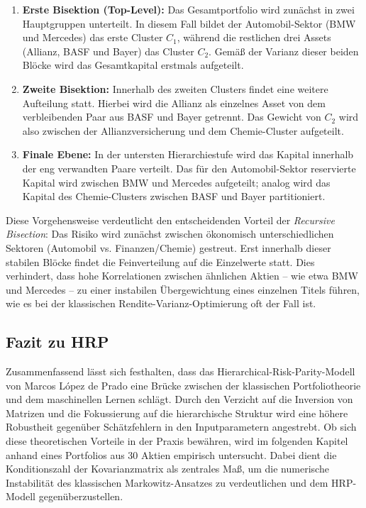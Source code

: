 \documentclass[parskip=half]{scrartcl}
\begin{document}
	\begin{enumerate}
		\item \textbf{Erste Bisektion (Top-Level):} Das Gesamtportfolio wird zunächst in zwei Hauptgruppen unterteilt. In diesem Fall bildet der Automobil-Sektor (BMW und Mercedes) das erste Cluster $C_1$, während die restlichen drei Assets (Allianz, BASF und Bayer) das Cluster $C_2$. Gemäß der Varianz dieser beiden Blöcke wird das Gesamtkapital erstmals aufgeteilt.
		\item \textbf{Zweite Bisektion:} Innerhalb des zweiten Clusters findet eine weitere Aufteilung statt. Hierbei wird die Allianz als einzelnes Asset von dem verbleibenden Paar aus BASF und Bayer getrennt. Das Gewicht von $C_2$ wird also zwischen der Allianzversicherung und dem Chemie-Cluster aufgeteilt.
		\item \textbf{Finale Ebene:} In der untersten Hierarchiestufe wird das Kapital innerhalb der eng verwandten Paare verteilt. Das für den Automobil-Sektor reservierte Kapital wird zwischen BMW und Mercedes aufgeteilt; analog wird das Kapital des Chemie-Clusters zwischen BASF und Bayer partitioniert.
	\end{enumerate}
	
	Diese Vorgehensweise verdeutlicht den entscheidenden Vorteil der \textit{Recursive Bisection}: Das Risiko wird zunächst zwischen ökonomisch unterschiedlichen Sektoren (Automobil vs. Finanzen/Chemie) gestreut. Erst innerhalb dieser stabilen Blöcke findet die Feinverteilung auf die Einzelwerte statt. Dies verhindert, dass hohe Korrelationen zwischen ähnlichen Aktien – wie etwa BMW und Mercedes – zu einer instabilen Übergewichtung eines einzelnen Titels führen, wie es bei der klassischen Rendite-Varianz-Optimierung oft der Fall ist.
	
	\subsection{Fazit zu HRP}
	
	Zusammenfassend lässt sich festhalten, dass das Hierarchical-Risk-Parity-Modell von Marcos López de Prado eine Brücke zwischen der klassischen Portfoliotheorie und dem maschinellen Lernen schlägt. Durch den Verzicht auf die Inversion von Matrizen und die Fokussierung auf die hierarchische Struktur wird eine höhere Robustheit gegenüber Schätzfehlern in den Inputparametern angestrebt. Ob sich diese theoretischen Vorteile in der Praxis bewähren, wird im folgenden Kapitel anhand eines Portfolios aus 30 Aktien empirisch untersucht. Dabei dient die Konditionszahl der Kovarianzmatrix als zentrales Maß, um die numerische Instabilität des klassischen Markowitz-Ansatzes zu verdeutlichen und dem HRP-Modell gegenüberzustellen.
	
\end{document}
